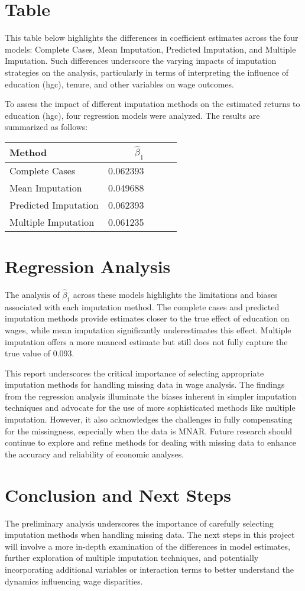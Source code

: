 \documentclass[12pt]{article}
\begin{document}
\section*{Table}
This table below highlights the differences in coefficient estimates across the four models: Complete Cases, Mean Imputation, Predicted Imputation, and Multiple Imputation. Such differences underscore the varying impacts of imputation strategies on the analysis, particularly in terms of interpreting the influence of education (hgc), tenure, and other variables on wage outcomes.

To assess the impact of different imputation methods on the estimated returns to education (hgc), four regression models were analyzed. The results are summarized as follows:

\begin{tabular}{lrrrr}
\toprule
Method & $\hat{\beta}_1$ \\
\midrule
Complete Cases & 0.062393 \\
Mean Imputation & 0.049688 \\
Predicted Imputation & 0.062393 \\
Multiple Imputation & 0.061235 \\
\bottomrule
\end{tabular}

\section{Regression Analysis}
The analysis of $\hat{\beta}_1$ across these models highlights the limitations and biases associated with each imputation method. The complete cases and predicted imputation methods provide estimates closer to the true effect of education on wages, while mean imputation significantly underestimates this effect. Multiple imputation offers a more nuanced estimate but still does not fully capture the true value of 0.093.

This report underscores the critical importance of selecting appropriate imputation methods for handling missing data in wage analysis. The findings from the regression analysis illuminate the biases inherent in simpler imputation techniques and advocate for the use of more sophisticated methods like multiple imputation. However, it also acknowledges the challenges in fully compensating for the missingness, especially when the data is MNAR. Future research should continue to explore and refine methods for dealing with missing data to enhance the accuracy and reliability of economic analyses.

\section*{Conclusion and Next Steps}
The preliminary analysis underscores the importance of carefully selecting imputation methods when handling missing data. The next steps in this project will involve a more in-depth examination of the differences in model estimates, further exploration of multiple imputation techniques, and potentially incorporating additional variables or interaction terms to better understand the dynamics influencing wage disparities.
\end{document}
